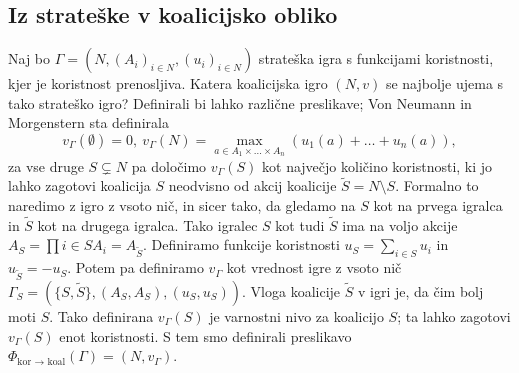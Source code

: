 \documentclass[10pt, a4paper]{article}
\begin{document}
\subsection{Iz strateške v koalicijsko obliko}

Naj bo $\Gamma = (N, (A_i)_{i \in N}, (u_i)_{i \in N})$ strateška igra s 
funkcijami koristnosti, kjer je koristnost prenosljiva.
Katera koalicijska igro $(N, v)$ se najbolje ujema s tako strateško igro?
Definirali bi lahko različne preslikave; Von Neumann in Morgenstern sta definirala 
$$v_{\Gamma}(\emptyset) = 0,\ v_{\Gamma}(N) = \max_{a \in A_1 \times \dots \times A_n} (u_1 (a) + \dots + u_n(a)),$$
za vse druge $S \subsetneq N$ pa določimo $v_{\Gamma} (S)$ kot največjo 
količino koristnosti, ki jo lahko zagotovi koalicija $S$ neodvisno od akcij koalicije $\tilde{S} = N \setminus S$.
Formalno to naredimo z igro z vsoto nič, in sicer tako,
da gledamo na $S$ kot na prvega igralca in $\tilde{S}$ kot na drugega igralca.
Tako igralec $S$ kot tudi $\tilde{S}$ ima na voljo akcije $A_S = \prod{i \in S} A_i = A_{\tilde{S}}$. 
Definiramo funkcije koristnosti $u_S = \sum_{i \in S} u_i$ in $u_{\widetilde{S}} = -u_S$.
Potem pa definiramo $v_{\Gamma}$ kot vrednost igre z vsoto nič 
$\Gamma_S = (\{S, \tilde{S}\}, (A_S, A_S), (u_S, u_S))$.
Vloga koalicije $\tilde{S}$ v igri je, da čim bolj moti $S$.
Tako definirana $v_{\Gamma} (S)$ je varnostni nivo za koalicijo $S$; ta lahko zagotovi $v_{\Gamma} (S)$
enot koristnosti. S tem smo definirali preslikavo $\Phi_{\text{kor $\to$ koal}} (\Gamma) = (N, v_{\Gamma})$.
\end{document}
